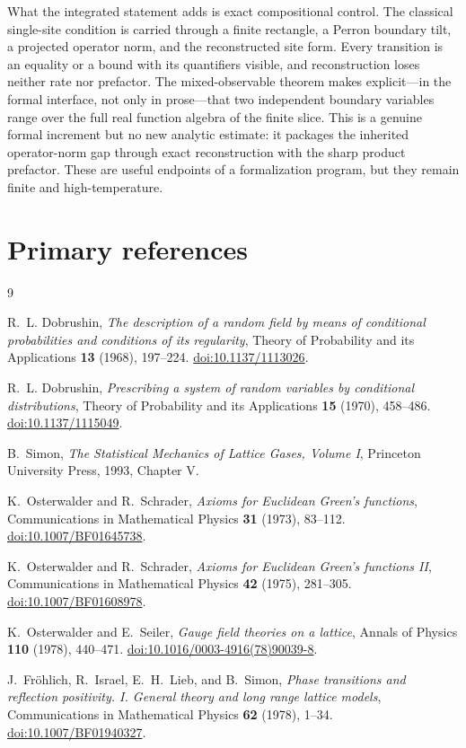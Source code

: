 \documentclass[11pt]{article}
\theoremstyle{definition}
\theoremstyle{remark}
\begin{document}
What the integrated statement adds is exact compositional control.  The
classical single-site condition is carried through a finite rectangle, a
Perron boundary tilt, a projected operator norm, and the reconstructed site
form.  Every transition is an equality or a bound with its quantifiers visible,
and reconstruction loses neither rate nor prefactor.  The mixed-observable
theorem makes explicit---in the formal interface, not only in prose---that two
independent boundary variables range over the full real function algebra of
the finite slice.  This is a genuine formal increment but no new analytic
estimate: it packages the inherited operator-norm gap through exact
reconstruction with the sharp product prefactor.  These are useful endpoints
of a formalization program, but they remain finite and high-temperature.

\section*{Primary references}

\begin{thebibliography}{9}

R.~L. Dobrushin,
\emph{The description of a random field by means of conditional probabilities
and conditions of its regularity},
Theory of Probability and its Applications \textbf{13} (1968), 197--224.
\href{https://doi.org/10.1137/1113026}{doi:10.1137/1113026}.

R.~L. Dobrushin,
\emph{Prescribing a system of random variables by conditional distributions},
Theory of Probability and its Applications \textbf{15} (1970), 458--486.
\href{https://doi.org/10.1137/1115049}{doi:10.1137/1115049}.

B.~Simon,
\emph{The Statistical Mechanics of Lattice Gases, Volume I},
Princeton University Press, 1993, Chapter V.

K.~Osterwalder and R.~Schrader,
\emph{Axioms for Euclidean Green's functions},
Communications in Mathematical Physics \textbf{31} (1973), 83--112.
\href{https://doi.org/10.1007/BF01645738}{doi:10.1007/BF01645738}.

K.~Osterwalder and R.~Schrader,
\emph{Axioms for Euclidean Green's functions II},
Communications in Mathematical Physics \textbf{42} (1975), 281--305.
\href{https://doi.org/10.1007/BF01608978}{doi:10.1007/BF01608978}.

K.~Osterwalder and E.~Seiler,
\emph{Gauge field theories on a lattice},
Annals of Physics \textbf{110} (1978), 440--471.
\href{https://doi.org/10.1016/0003-4916(78)90039-8}{doi:10.1016/0003-4916(78)90039-8}.

J.~Fr\"ohlich, R.~Israel, E.~H.~Lieb, and B.~Simon,
\emph{Phase transitions and reflection positivity. I. General theory and
long range lattice models},
Communications in Mathematical Physics \textbf{62} (1978), 1--34.
\href{https://doi.org/10.1007/BF01940327}{doi:10.1007/BF01940327}.

\end{thebibliography}
\end{document}

